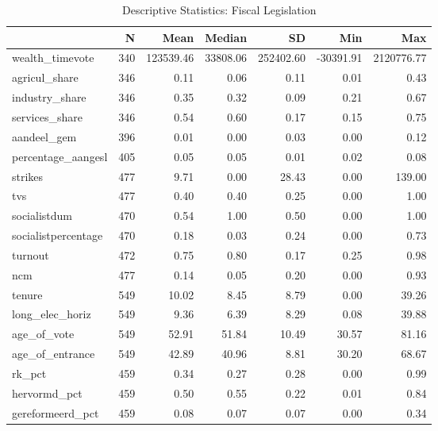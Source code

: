 \begin{table}[!h]

\caption{\label{tab:descriptives_fiscal}Descriptive Statistics: Fiscal Legislation}
\centering
\fontsize{9}{11}\selectfont
\begin{tabular}[t]{lrrrrrr}
\toprule
  & N & Mean & Median & SD & Min & Max\\
\midrule
wealth\_timevote & 340 & 123539.46 & 33808.06 & 252402.60 & -30391.91 & 2120776.77\\
agricul\_share & 346 & 0.11 & 0.06 & 0.11 & 0.01 & 0.43\\
industry\_share & 346 & 0.35 & 0.32 & 0.09 & 0.21 & 0.67\\
services\_share & 346 & 0.54 & 0.60 & 0.17 & 0.15 & 0.75\\
aandeel\_gem & 396 & 0.01 & 0.00 & 0.03 & 0.00 & 0.12\\
percentage\_aangesl & 405 & 0.05 & 0.05 & 0.01 & 0.02 & 0.08\\
strikes & 477 & 9.71 & 0.00 & 28.43 & 0.00 & 139.00\\
tvs & 477 & 0.40 & 0.40 & 0.25 & 0.00 & 1.00\\
socialistdum & 470 & 0.54 & 1.00 & 0.50 & 0.00 & 1.00\\
socialistpercentage & 470 & 0.18 & 0.03 & 0.24 & 0.00 & 0.73\\
turnout & 472 & 0.75 & 0.80 & 0.17 & 0.25 & 0.98\\
ncm & 477 & 0.14 & 0.05 & 0.20 & 0.00 & 0.93\\
tenure & 549 & 10.02 & 8.45 & 8.79 & 0.00 & 39.26\\
long\_elec\_horiz & 549 & 9.36 & 6.39 & 8.29 & 0.08 & 39.88\\
age\_of\_vote & 549 & 52.91 & 51.84 & 10.49 & 30.57 & 81.16\\
age\_of\_entrance & 549 & 42.89 & 40.96 & 8.81 & 30.20 & 68.67\\
rk\_pct & 459 & 0.34 & 0.27 & 0.28 & 0.00 & 0.99\\
hervormd\_pct & 459 & 0.50 & 0.55 & 0.22 & 0.01 & 0.84\\
gereformeerd\_pct & 459 & 0.08 & 0.07 & 0.07 & 0.00 & 0.34\\
\bottomrule
\end{tabular}
\end{table}